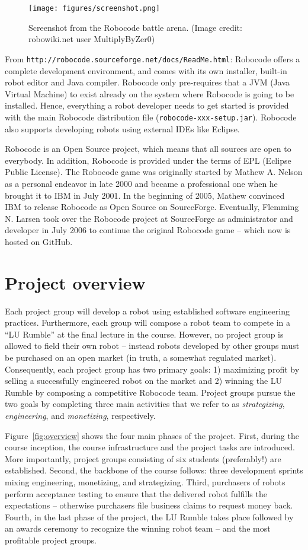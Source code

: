 \documentclass{scrreprt}
\begin{document}
\begin{figure}
\centering
\texttt{[image: figures/screenshot.png]}
\caption{Screenshot from the Robocode battle arena. (Image credit: robowiki.net user MultiplyByZer0)}
\label{fig:screenshot}
\end{figure}

From \texttt{http://robocode.sourceforge.net/docs/ReadMe.html}:
Robocode offers a complete development environment, and comes with its own installer, built-in robot editor and Java compiler. Robocode only pre-requires that a JVM (Java Virtual Machine) to exist already on the system where Robocode is going to be installed. Hence, everything a robot developer needs to get started is provided with the main Robocode distribution file (\texttt{robocode-xxx-setup.jar}). Robocode also supports developing robots using external IDEs like Eclipse.

Robocode is an Open Source project, which means that all sources are open to everybody. In addition, Robocode is provided under the terms of EPL (Eclipse Public License). The Robocode game was originally started by Mathew A. Nelson as a personal endeavor in late 2000 and became a professional one when he brought it to IBM in July 2001. In the beginning of 2005, Mathew convinced IBM to release Robocode as Open Source on SourceForge. Eventually, Flemming N. Larsen took over the Robocode project at SourceForge as administrator and developer in July 2006 to continue the original Robocode game -- which now is hosted on GitHub.

\section{Project overview}
Each project group will develop a robot using established software engineering practices. Furthermore, each group will compose a robot team to compete in a ``LU Rumble'' at the final lecture in the course. However, no project group is allowed to field their own robot -- instead robots developed by other groups must be purchased on an open market (in truth, a somewhat regulated market). Consequently, each project group has two primary goals: 1) maximizing profit by selling a successfully engineered robot on the market and 2) winning the LU Rumble by composing a competitive Robocode team. Project groups pursue the two goals by completing three main activities that we refer to as \textit{strategizing}, \textit{engineering}, and \textit{monetizing}, respectively.

Figure~\ref{fig:overview} shows the four main phases of the project. First, during the course inception, the course infrastructure and the project tasks are introduced. More importantly, project groups consisting of six students (preferably!) are established. Second, the backbone of the course follows: three development sprints mixing engineering, monetizing, and strategizing. Third, purchasers of robots perform acceptance testing to ensure that the delivered robot fulfills the expectations -- otherwise purchasers file business claims to request money back. Fourth, in the last phase of the project, the LU Rumble takes place followed by an awards ceremony to recognize the winning robot team -- and the most profitable project groups.
\end{document}
